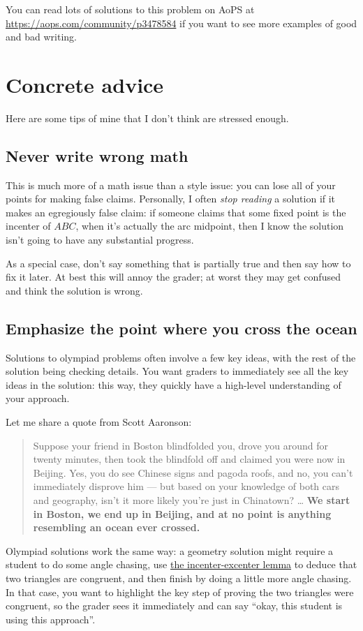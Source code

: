 \documentclass[11pt]{scrartcl}
\begin{document}
You can read lots of solutions to this problem on AoPS at
\url{https://aops.com/community/p3478584}
if you want to see more examples of good and bad writing.

\newpage

\section{Concrete advice}
Here are some tips of mine that I don't think are stressed enough.

\subsection{Never write wrong math}
This is much more of a math issue than a style issue:
you can lose all of your points for making false claims.
Personally, I often \emph{stop reading} a solution if it makes
an egregiously false claim: if someone claims that some fixed
point is the incenter of $ABC$,
when it's actually the arc midpoint,
then I know the solution isn't going to have any substantial progress.

As a special case, don't say something that is partially true
and then say how to fix it later.
At best this will annoy the grader;
at worst they may get confused and think the solution is wrong.

\subsection{Emphasize the point where you cross the ocean}
Solutions to olympiad problems often involve a few key ideas,
with the rest of the solution being checking details.
You want graders to immediately see all the key ideas in the solution:
this way, they quickly have a high-level understanding of your approach.

Let me share a quote from Scott Aaronson:
\begin{quote}
  Suppose your friend in Boston blindfolded you,
  drove you around for twenty minutes,
  then took the blindfold off and claimed you were now in Beijing.
  Yes, you do see Chinese signs and pagoda roofs,
  and no, you can't immediately disprove him ---
  but based on your knowledge of both cars and geography,
  isn't it more likely you're just in Chinatown?
  \dots
  \textbf{We start in Boston, we end up in Beijing,
  and at no point is anything resembling an ocean ever crossed.}
\end{quote}
Olympiad solutions work the same way:
a geometry solution might require a student to do some angle chasing,
use \href{https://w.wiki/AEpo}{the incenter-excenter lemma} to deduce that two triangles are congruent,
and then finish by doing a little more angle chasing.
In that case, you want to highlight the key step of proving the two triangles
were congruent, so the grader sees it immediately and can say
``okay, this student is using this approach''.
\end{document}
